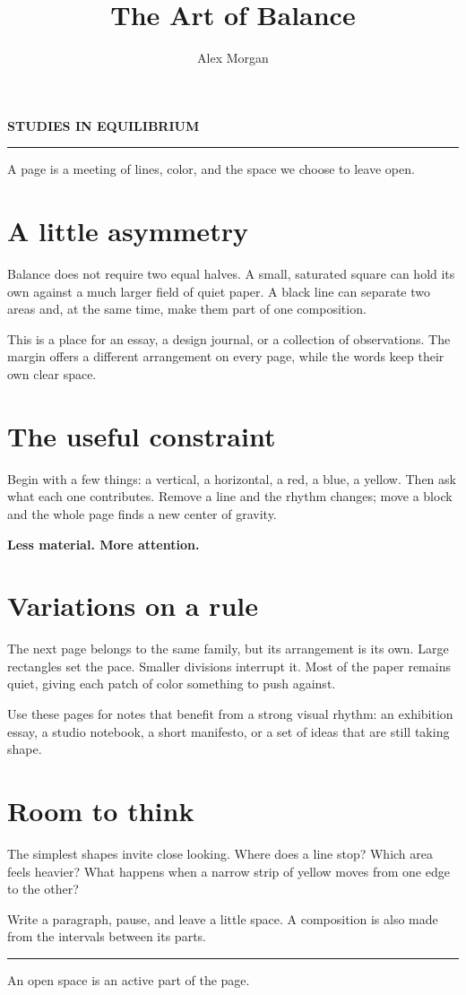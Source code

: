 \documentclass[11pt,a4paper]{article}
\title{The Art of Balance}
\author{Alex Morgan}
\date{}
\makeatletter
\renewcommand{\maketitle}{%
  {\sffamily\small\bfseries\textcolor{mondrianBlue}{STUDIES IN EQUILIBRIUM}\par}
  \vspace{13mm}
  {\sffamily\fontsize{39}{41}\selectfont\bfseries\raggedright\@title\par}
  \vspace{7mm}
  {\sffamily\small\@author\par}
  \vspace{10mm}
  {\color{mondrianBlack}\rule{\linewidth}{2.8pt}}\par\vspace{4mm}}
\makeatother
\begin{document}
\maketitle
{\large A page is a meeting of lines, color, and the space we choose to leave open.\par}
\section{A little asymmetry}
Balance does not require two equal halves. A small, saturated square can hold its own against a much larger field of quiet paper. A black line can separate two areas and, at the same time, make them part of one composition.

This is a place for an essay, a design journal, or a collection of observations. The margin offers a different arrangement on every page, while the words keep their own clear space.
\section{The useful constraint}
Begin with a few things: a vertical, a horizontal, a red, a blue, a yellow. Then ask what each one contributes. Remove a line and the rhythm changes; move a block and the whole page finds a new center of gravity.

{\sffamily\bfseries\textcolor{mondrianBlue}{Less material. More attention.}\par}
\clearpage
\section{Variations on a rule}
The next page belongs to the same family, but its arrangement is its own. Large rectangles set the pace. Smaller divisions interrupt it. Most of the paper remains quiet, giving each patch of color something to push against.

Use these pages for notes that benefit from a strong visual rhythm: an exhibition essay, a studio notebook, a short manifesto, or a set of ideas that are still taking shape.
\section{Room to think}
The simplest shapes invite close looking. Where does a line stop? Which area feels heavier? What happens when a narrow strip of yellow moves from one edge to the other?

Write a paragraph, pause, and leave a little space. A composition is also made from the intervals between its parts.

\vspace{8mm}
{\color{mondrianRed}\rule{24mm}{3pt}}\par
{\sffamily\small An open space is an active part of the page.}
\end{document}
